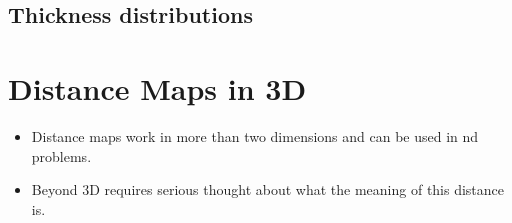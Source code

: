 \documentclass[letterpaper,10pt,english]{sphinxmanual}
\begin{document}
\section{Thickness distributions}
\label{\detokenize{06-AdvancedShapeAndTexture:thickness-distributions}}
\begin{sphinxVerbatim}[commandchars=\\\{\}]
        

\PYG{p}{[}  \PYG{p}{]}  
\PYG{p}{[}  \PYG{p}{]}  
\end{sphinxVerbatim}

\noindent{}


\chapter{Distance Maps in 3D}
\label{\detokenize{06-AdvancedShapeAndTexture:distance-maps-in-3d}}\begin{itemize}
\item {} 
\sphinxAtStartPar
Distance maps work in more than two dimensions and can be used in n\sphinxhyphen{}d problems.

\item {} 
\sphinxAtStartPar
Beyond 3D requires serious thought about what the meaning of this distance is.

\end{itemize}
\end{document}
